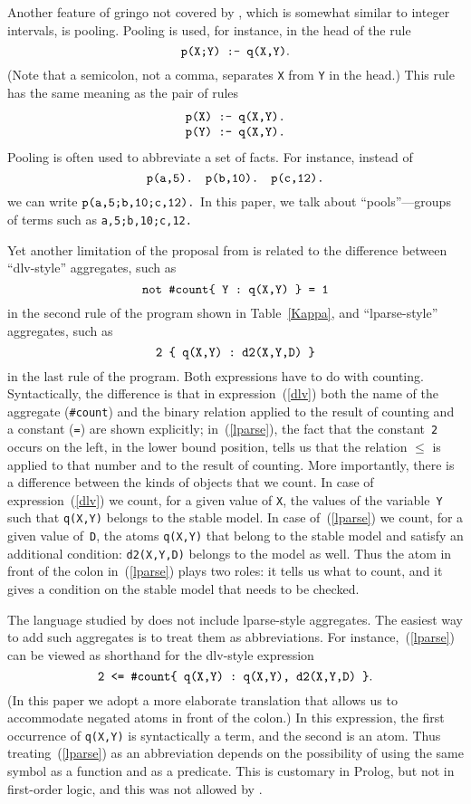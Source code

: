\documentclass{tlp}
\def\beq{\begin{equation}}
\def\eeq#1{\label{#1}\end{equation}}
\def\ba{\begin{array}}
\def\ea{\end{array}}
\begin{document}
Another feature of {\sc gringo} not covered by  
\citeyear{har14a}, which is somewhat
similar to integer intervals, is pooling.  Pooling is used, for instance, in
the head of the rule
$$\hbox{\tt p(X;Y) :- q(X,Y)}.$$
(Note that a semicolon, not a comma, separates {\tt X} from {\tt Y} in
the head.) This rule has the same meaning as the pair of rules
$$\ba c
\hbox{\tt p(X) :- q(X,Y).}\\
\hbox{\tt p(Y) :- q(X,Y).}
\ea
$$
Pooling is often used to abbreviate a set of facts.  For instance, instead of
$$\hbox{\tt p(a,5).}\quad\hbox{\tt p(b,10).}\quad\hbox{\tt p(c,12).}$$
we can write
$\hbox{\tt p(a,5;b,10;c,12).}$
In this paper, we talk about ``pools''---groups of terms such as
\hbox{\tt a,5;b,10;c,12.}

Yet another limitation of the proposal from  \citeyear{har14a} is related to the difference between
``dlv-style'' aggregates, such as
\beq
\hbox{\tt not \#count\{ Y : q(X,Y) \} = 1}
\eeq{dlv}
in the second rule of the program shown in Table~\ref{Kappa}, and
``lparse-style'' aggregates, such as
\beq
\hbox{\tt 2 \{ q(X,Y) : d2(X,Y,D) \}}
\eeq{lparse}
in the last rule of the program.  Both expressions have to do with counting.
Syntactically, the difference is that in expression~(\ref{dlv}) both the name
of the aggregate ({\tt \#count}) and the binary relation applied to the result
of counting and a constant ({\tt =}) are shown explicitly; in~(\ref{lparse}),
the fact that the constant~{\tt 2}
occurs on the left, in the lower bound position, tells us that the
relation $\leq$ is applied to that number and to the result of counting.
More importantly, there is a difference between the kinds of objects that we
count.  In case of expression~(\ref{dlv}) we count, for a given value of
{\tt X},  the values of the variable~{\tt Y} such that {\tt q(X,Y)}
belongs to the stable model.  In case of~(\ref{lparse}) we count, for a given
value of~{\tt D},  the atoms {\tt q(X,Y)} that belong to the stable model
and satisfy an additional condition: {\tt d2(X,Y,D)} belongs to the model
as well.  Thus the atom in front of the colon in~(\ref{lparse}) plays two
roles: it tells us what to count, and it gives a condition on the stable
model that needs to be checked.

The language studied by  \citeyear{har14a} does not include 
lparse-style
aggregates.  The easiest way to add such aggregates is to treat them as
abbreviations.  For instance,~(\ref{lparse}) can be viewed as shorthand for
the dlv-style expression
$$\hbox{\tt 2 <= \#count\{ q(X,Y) : q(X,Y), d2(X,Y,D) \}}.$$
(In this paper we adopt a more elaborate translation that allows us to
accommodate negated atoms in front of the colon.)  In this expression, the
first occurrence of {\tt q(X,Y)} is syntactically a term, and the second is
an atom.  Thus treating~(\ref{lparse}) as an abbreviation depends on the
possibility of using the same symbol as a function and as a predicate.  This is
customary in Prolog, but not in first-order logic, and this was not allowed by 
 \citeyear{har14a}.
\end{document}
